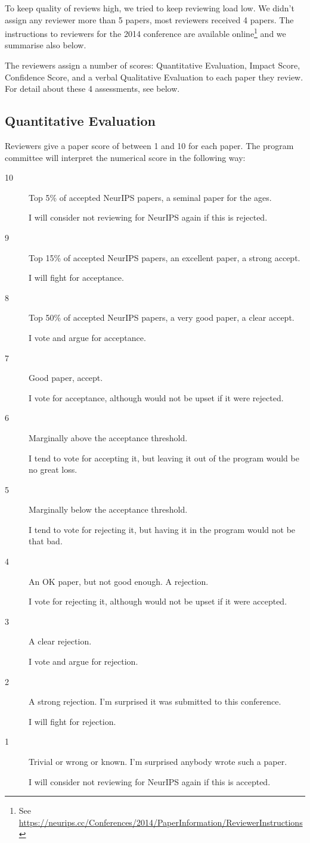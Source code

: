 To keep quality of reviews high, we tried to keep reviewing load low. We didn't
assign any reviewer more than 5 papers, most reviewers received 4
papers.
The instructions to reviewers for the 2014 conference are 
available online\footnote{See  
\url{https://neurips.cc/Conferences/2014/PaperInformation/ReviewerInstructions}} and we summarise also below.

The reviewers assign a number of scores: Quantitative Evaluation,
Impact Score, Confidence Score, and a verbal Qualitative Evaluation to
each paper they review. For detail about these 4 assessments, see below.

\subsection*{Quantitative Evaluation}\label{quantitative-evaluation}
Reviewers give a paper score of between 1 and 10 for each paper. The program
committee will interpret the numerical score in the following way:

\begin{description}
\item[10] Top 5\% of accepted NeurIPS papers, a seminal paper for the ages.

  I will consider not reviewing for NeurIPS again if this is rejected.
\item[9] Top 15\% of accepted NeurIPS papers, an excellent paper, a strong
  accept.

  I will fight for acceptance.
\item[8] Top 50\% of accepted NeurIPS papers, a very good paper, a clear
  accept.

  I vote and argue for acceptance.
\item[7] Good paper, accept.

  I vote for acceptance, although would not be upset if it were
  rejected.
\item[6] Marginally above the acceptance threshold.

  I tend to vote for accepting it, but leaving it out of the program
  would be no great loss.
\item[5] Marginally below the acceptance threshold.

  I tend to vote for rejecting it, but having it in the program would
  not be that bad.
\item[4] An OK paper, but not good enough. A rejection.

  I vote for rejecting it, although would not be upset if it were
  accepted.
\item[3] A clear rejection.

  I vote and argue for rejection.
\item[2] A strong rejection. I'm surprised it was submitted to this
  conference.

  I will fight for rejection.
\item[1] Trivial or wrong or known. I'm surprised anybody wrote such a
  paper.

  I will consider not reviewing for NeurIPS again if this is accepted.
\end{description}

